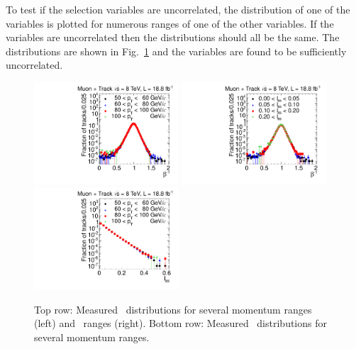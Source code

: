 To test if the selection variables are uncorrelated, the distribution of one of the variables is plotted for numerous ranges of one of the other variables.
If the variables are uncorrelated then the distributions should all be the same. 
The distributions are shown in Fig.~\ref{fig:correlation} and the variables are found to be sufficiently uncorrelated.

\begin{figure}%
\begin{center}
\includegraphics[clip=false, trim=0.0cm 0cm 0.0cm 0cm, width=0.48\textwidth]{figures/tkmu/Control_Data8TeV_Pt_TOFSpectrum}
\includegraphics[clip=false, trim=0.0cm 0cm 0.0cm 0cm, width=0.48\textwidth]{figures/tkmu/Control_Data8TeV_Is_TOFSpectrumLog}
\includegraphics[clip=false, trim=0.0cm 0cm 0.0cm 0cm, width=0.48\textwidth]{figures/tkmu/Control_Data8TeV_Pt_IsSpectrum}
\caption[Distribution of selection variables in the \tktof\ analysis for different ranges of the other variables]
{Top row: Measured \invbeta\ distributions for several momentum ranges (left)
and \ias\ ranges (right). Bottom row:  Measured \ias\ distributions for several momentum  ranges.
}
\label{fig:correlation}
\end{center}
\end{figure}

